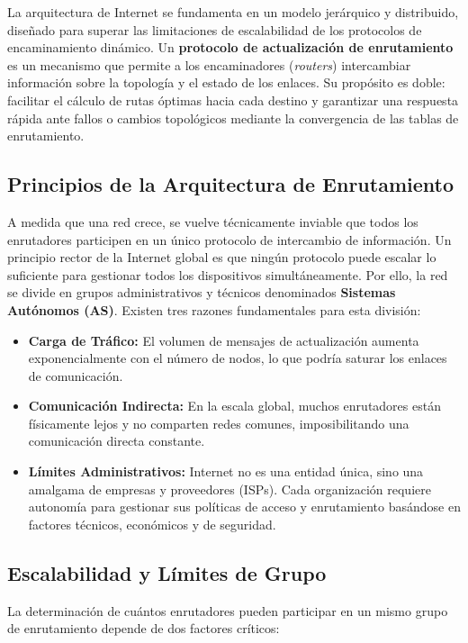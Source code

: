 La arquitectura de Internet se fundamenta en un modelo jerárquico y distribuido, diseñado para superar las limitaciones de escalabilidad de los protocolos de encaminamiento dinámico. Un \textbf{protocolo de actualización de enrutamiento} es un mecanismo que permite a los encaminadores (\textit{routers}) intercambiar información sobre la topología y el estado de los enlaces. Su propósito es doble: facilitar el cálculo de rutas óptimas hacia cada destino y garantizar una respuesta rápida ante fallos o cambios topológicos mediante la convergencia de las tablas de enrutamiento.

\subsection{Principios de la Arquitectura de Enrutamiento}

A medida que una red crece, se vuelve técnicamente inviable que todos los enrutadores participen en un único protocolo de intercambio de información. Un principio rector de la Internet global es que ningún protocolo puede escalar lo suficiente para gestionar todos los dispositivos simultáneamente. Por ello, la red se divide en grupos administrativos y técnicos denominados \textbf{Sistemas Autónomos (AS)}. Existen tres razones fundamentales para esta división:

\begin{itemize}
	\item \textbf{Carga de Tráfico:} El volumen de mensajes de actualización aumenta exponencialmente con el número de nodos, lo que podría saturar los enlaces de comunicación.
	\item \textbf{Comunicación Indirecta:} En la escala global, muchos enrutadores están físicamente lejos y no comparten redes comunes, imposibilitando una comunicación directa constante.
	\item \textbf{Límites Administrativos:} Internet no es una entidad única, sino una amalgama de empresas y proveedores (ISPs). Cada organización requiere autonomía para gestionar sus políticas de acceso y enrutamiento basándose en factores técnicos, económicos y de seguridad.
\end{itemize}

\subsection{Escalabilidad y Límites de Grupo}

La determinación de cuántos enrutadores pueden participar en un mismo grupo de enrutamiento depende de dos factores críticos:

